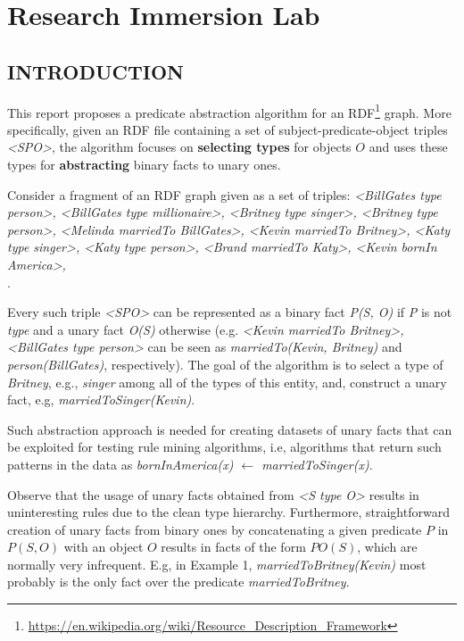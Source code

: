 \chapter{Research Immersion Lab}

\section{INTRODUCTION}
This report proposes a predicate abstraction algorithm for an RDF\footnote{\url{https://en.wikipedia.org/wiki/Resource_Description_Framework}} graph. More specifically, given an RDF file containing a set of subject-predicate-object triples \textit{<SPO>}, the algorithm focuses on \textbf{selecting types} for objects $O$ and uses these types for \textbf{abstracting} binary facts to unary ones.

\begin{example}
\label{ex1}
Consider a fragment of an RDF graph given as a set of triples: \textit{<BillGates type person>, <BillGates type millionaire>, <Britney type singer>, <Britney type person>, <Melinda marriedTo BillGates>, <Kevin marriedTo Britney>, <Katy type singer>, <Katy type person>, <Brand marriedTo Katy>, <Kevin bornIn America>, \\<Brand bornIn America>}.
\end{example}

Every such triple \textit{<SPO>} can be represented as a binary fact \textit{P(S, O)} if \textit{P} is not \textit{type} and a unary fact \textit{O(S)} otherwise (e.g. \textit{<Kevin marriedTo Britney>, <BillGates type person>} can be seen as \textit{marriedTo(Kevin, Britney)} and \textit{person(BillGates)}, respectively). The goal of the algorithm is to select a type of \textit{Britney}, e.g., \textit{singer} among all of the types of this entity, and, construct a unary fact, e.g, \textit{marriedToSinger(Kevin)}.

Such abstraction approach is needed for creating datasets of unary facts that can be exploited for testing rule mining algorithms, i.e, algorithms that return such patterns in the data as \textit{bornInAmerica(x) $\leftarrow$ marriedToSinger(x)}.

Observe that the usage of unary facts obtained from \textit{<S type O>} results in uninteresting rules due to the clean type hierarchy. Furthermore, straightforward creation of unary facts from binary ones by concatenating a given predicate $P$ in $P(S, O)$ with an object $O$ results in facts of the form $PO(S)$, which are normally very infrequent. E.g, in Example 1, \textit{marriedToBritney(Kevin)} most probably is the only fact over the predicate \textit{marriedToBritney}.

